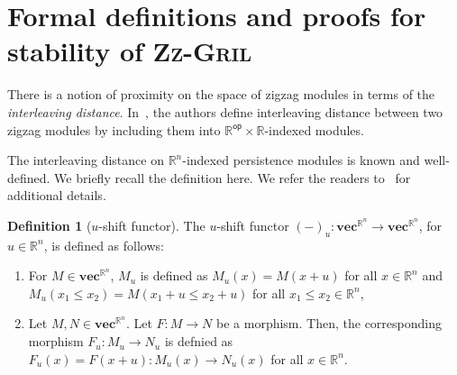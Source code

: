 \documentclass{article}
\newcommand{\zzgril}{\textsc{Zz-Gril}}
\newcommand{\RR}{\mathbb{R}}
\newcommand{\zz}{\mathbb{ZZ}}
\newcommand{\z}{\mathbb{Z}}
\theoremstyle{plain}
\theoremstyle{definition}
\newtheorem{definition}[theorem]{Definition}
\theoremstyle{remark}
\begin{document}
\newpage
\appendix

\section{Formal definitions and proofs for stability of \zzgril{}}
\label{app:proofs}




There is a notion of proximity on the space of zigzag modules in terms of the \emph{interleaving distance}. In~\cite{zz_stability}, the authors define interleaving distance between two zigzag modules by including them into $\RR^{\mathsf{op}} \times \RR$-indexed modules.


The interleaving distance on $\RR^n$-indexed persistence modules is known and well-defined. We briefly recall the definition here. We refer the readers to~\cite{zz_stability} for additional details.

\begin{definition}[$u$-shift functor]
    The $u$-shift functor $(-)_u \colon \mathbf{vec}^{\RR^n} \to \mathbf{vec}^{\RR^n}$, for $u \in \RR^n$, is defined as follows:
    \begin{enumerate}
        \item For $M \in \mathbf{vec}^{\RR^n}$, $M_u$ is defined as $M_u(x) = M(x+u)$ for all $x \in \RR^n$ and $M_u(x_1 \leq x_2) = M(x_1 + u \leq x_2 + u)$ for all $x_1 \leq x_2 \in \RR^n$, 
        \item Let $M,N \in \mathbf{vec}^{\RR^n}$. Let $F \colon M \to N$ be a morphism. Then, the corresponding morphism $F_u \colon M_u \to N_u$ is defnied as $F_u(x) = F(x+u) \colon M_u(x) \to N_u(x)$ for all $x \in \RR^n$.
    \end{enumerate}
\end{definition}
\end{document}
